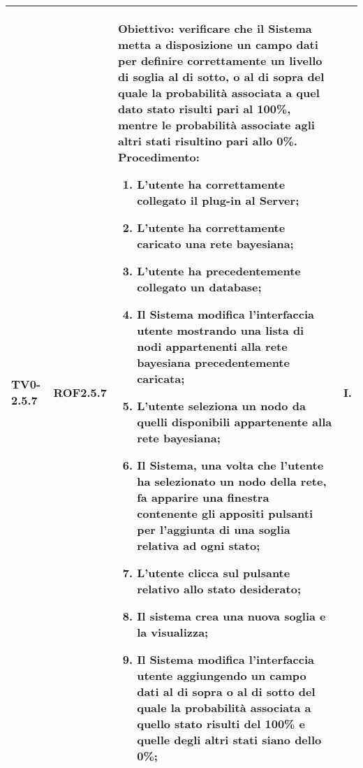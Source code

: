 \begin{longtable}{|C{.15\textwidth}|C{.13\textwidth}|m{.52\textwidth}|C{.08\textwidth}|}
TV0-2.5.7 & ROF2.5.7 &
	\textbf{Obiettivo}: verificare che il Sistema metta a disposizione un campo dati per definire correttamente un livello di soglia al di sotto, o al di sopra del quale la probabilità associata a quel dato stato risulti pari al 100\%, mentre le probabilità associate agli altri stati risultino pari allo 0\%. \newline
	\textbf{Procedimento}:
	\begin{enumerate}
		\item L'utente ha correttamente collegato il plug-in al Server;
		\item L'utente ha correttamente caricato una rete bayesiana;
		\item L'utente ha precedentemente collegato un database;
		\item Il Sistema modifica l'interfaccia utente mostrando una lista di nodi appartenenti alla rete bayesiana precedentemente caricata;
		\item L'utente seleziona un nodo da quelli disponibili appartenente alla rete bayesiana;
		\item Il Sistema, una volta che l'utente ha selezionato un nodo della rete, fa apparire una finestra contenente gli appositi pulsanti per l'aggiunta di una soglia relativa ad ogni stato;
		\item L'utente clicca sul pulsante relativo allo stato desiderato;
		\item Il sistema crea una nuova soglia e la visualizza;
		\item Il Sistema modifica l'interfaccia utente aggiungendo un campo dati al di sopra o al di sotto del quale la probabilità associata a quello stato risulti del 100\% e quelle degli altri stati siano dello 0\%;
	\end{enumerate}
	& I. \\
\hline


\end{longtable}
